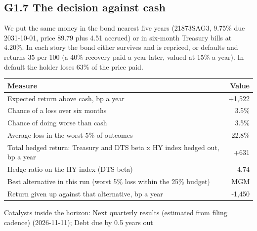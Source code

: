 \documentclass[11pt,a4paper]{article}
\begin{document}
\subsection*{G1.7 The decision against cash}
We put the same money in the bond nearest five years (21873SAG3, 9.75\% due 2031-10-01, price 89.79 plus 4.51 accrued) or in six-month Treasury bills at 4.20\%. In each story the bond either survives and is repriced, or defaults and returns 35 per 100 (a 40\% recovery paid a year later, valued at 15\% a year). In default the holder loses 63\% of the price paid.
\begin{center}\footnotesize\setlength{\tabcolsep}{3.5pt}\begin{tabular}{@{}lr@{}}\toprule
Measure & Value \\\midrule
Expected return above cash, bp a year & +1,522 \\
Chance of a loss over six months & 3.5\% \\
Chance of doing worse than cash & 3.5\% \\
Average loss in the worst 5\% of outcomes & 22.8\% \\
Total hedged return: Treasury and DTS beta x HY index hedged out, bp a year & +631 \\
Hedge ratio on the HY index (DTS beta) & 4.74 \\
Best alternative in this run (worst 5\% loss within the 25\% budget) & MGM \\
Return given up against that alternative, bp a year & -1,450 \\
\bottomrule\end{tabular}\end{center}
Catalysts inside the horizon: Next quarterly results (estimated from filing cadence) (2026-11-11); Debt due by 0.5 years out
\end{document}
